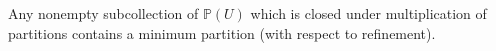 Any nonempty subcollection of $\mathbb{P}(U)$ which is closed under multiplication of partitions contains a minimum partition (with respect to refinement).
